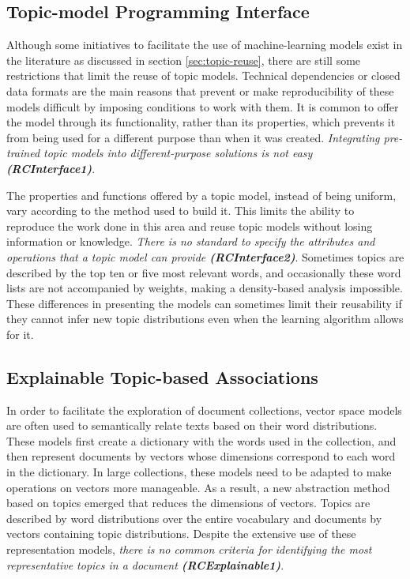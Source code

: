 \subsection{Topic-model Programming Interface}

Although some initiatives to facilitate the use of machine-learning models exist in the literature as discussed in section \ref{sec:topic-reuse}, there are still some restrictions that limit the reuse of topic models. Technical dependencies or closed data formats are the main reasons that prevent or make reproducibility of these models difficult by imposing conditions to work with them. It is common to offer the model through its functionality, rather than its properties, which prevents it from being used for a different purpose than when it was created. \textit{Integrating pre-trained topic models into different-purpose solutions is not easy \textbf{(RCInterface1)}}.

The properties and functions offered by a topic model, instead of being uniform, vary according to the method used to build it. This limits the ability to reproduce the work done in this area and reuse topic models without losing information or knowledge. \textit{There is no standard to specify the attributes and operations that a topic model can provide \textbf{(RCInterface2)}}. Sometimes topics are described by the top ten or five most relevant words, and occasionally these word lists are not accompanied by weights, making a density-based analysis impossible. These differences in presenting the models can sometimes limit their reusability if they cannot infer new topic distributions even when the learning algorithm allows for it.


\subsection{Explainable Topic-based Associations}

In order to facilitate the exploration of document collections, vector space models are often used to semantically relate texts based on their word distributions. These models first create a dictionary with the words used in the collection, and then represent  documents by vectors whose dimensions correspond to each word in the dictionary. In large collections, these models need to be adapted to make operations on vectors more manageable. As a result, a new abstraction method based on topics emerged that reduces the dimensions of vectors. Topics are described by word distributions over the entire vocabulary and documents by vectors containing topic distributions. Despite the extensive use of these representation models, \textit{there is no common criteria for identifying the most representative topics in a document \textbf{(RCExplainable1)}}. 

